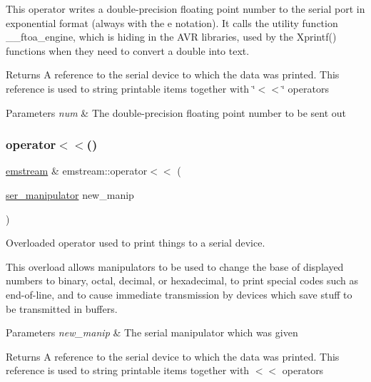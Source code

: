 This operator writes a double-\/precision floating point number to the serial port in exponential format (always with the \textquotesingle{}e\textquotesingle{} notation). It calls the utility function \+\_\+\+\_\+ftoa\+\_\+engine, which is hiding in the A\+VR libraries, used by the Xprintf() functions when they need to convert a double into text. \begin{DoxyReturn}{Returns}
A reference to the serial device to which the data was printed. This reference is used to string printable items together with \char`\"{}$<$$<$\char`\"{} operators 
\end{DoxyReturn}

\begin{DoxyParams}{Parameters}
{\em num} & The double-\/precision floating point number to be sent out \\
\hline
\end{DoxyParams}
\mbox{\label{classemstream_a10a043d75a8d229974282c0bac207dab}} 
\subsubsection{\texorpdfstring{operator$<$$<$()}{operator<<()}\hspace{0.1cm}{\footnotesize\ttfamily [14/14]}}
{\footnotesize\ttfamily \mbox{\hyperlink{classemstream}{emstream}} \& emstream\+::operator$<$$<$ (\begin{DoxyParamCaption}\item[{\mbox{\hyperlink{emstream_8h_a5582483c459c0f48e51d96478d5b3407}{ser\+\_\+manipulator}}}]{new\+\_\+manip }\end{DoxyParamCaption})}



Overloaded operator used to print things to a serial device. 

This overload allows manipulators to be used to change the base of displayed numbers to binary, octal, decimal, or hexadecimal, to print special codes such as end-\/of-\/line, and to cause immediate transmission by devices which save stuff to be transmitted in buffers. 
\begin{DoxyParams}{Parameters}
{\em new\+\_\+manip} & The serial manipulator which was given \\
\hline
\end{DoxyParams}
\begin{DoxyReturn}{Returns}
A reference to the serial device to which the data was printed. This reference is used to string printable items together with {\ttfamily $<$$<$} operators 
\end{DoxyReturn}
\mbox{\label{classemstream_a67dc7f8341184dffa95daf0104406e17}} 
